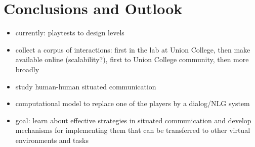 
\section{Conclusions and Outlook}

\begin{itemize}
\item currently: playtests to design levels
\item collect a corpus of interactions: first in the lab at Union
  College, then make available online (scalability?), first to Union College
  community, then more broadly
\item study human-human situated communication
\item computational model to replace one of the players by a
  dialog/NLG system
\item goal: learn about effective strategies in situated communication
  and develop mechanisms for implementing them that can be transferred
  to other virtual environments and tasks
\end{itemize}
